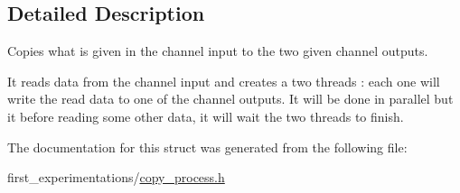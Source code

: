 \subsection{Detailed Description}
Copies what is given in the channel input to the two given channel outputs. 

It reads data from the channel input and creates a two threads \-: each one will write the read data to one of the channel outputs. It will be done in parallel but it before reading some other data, it will wait the two threads to finish. 

The documentation for this struct was generated from the following file\-:\begin{DoxyCompactItemize}
\item 
first\-\_\-experimentations/\hyperlink{copy__process_8h}{copy\-\_\-process.\-h}\end{DoxyCompactItemize}
